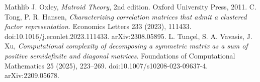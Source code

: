 \documentclass[11pt,letterpaper,reqno]{amsart}
\theoremstyle{spaced}
\begin{document}
\begin{thebibliography}{Mathlib}
 J. Oxley, \emph{Matroid Theory}, 2nd edition. Oxford University Press, 2011.
 C. Tong, P. R. Hansen, \emph{Characterizing correlation matrices that admit a clustered factor representation}. Economics Letters 233 (2023), 111433. doi:10.1016/j.econlet.2023.111433. arXiv:2308.05895.
 L. Tunçel, S. A. Vavasis, J. Xu, \emph{Computational complexity of decomposing a symmetric matrix as a sum of positive semidefinite and diagonal matrices}. Foundations of Computational Mathematics 25 (2025), 223--269. doi:10.1007/s10208-023-09637-4. arXiv:2209.05678.
\end{thebibliography}
\end{document}
